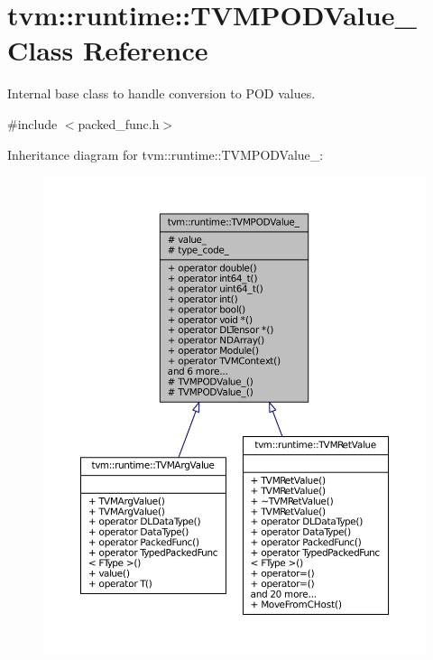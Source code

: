 \hypertarget{classtvm_1_1runtime_1_1TVMPODValue__}{}\section{tvm\+:\+:runtime\+:\+:T\+V\+M\+P\+O\+D\+Value\+\_\+ Class Reference}
\label{classtvm_1_1runtime_1_1TVMPODValue__}


Internal base class to handle conversion to P\+OD values.  




{\ttfamily \#include $<$packed\+\_\+func.\+h$>$}



Inheritance diagram for tvm\+:\+:runtime\+:\+:T\+V\+M\+P\+O\+D\+Value\+\_\+\+:
\nopagebreak
\begin{figure}[H]
\begin{center}
\leavevmode
\includegraphics[width=350pt]{classtvm_1_1runtime_1_1TVMPODValue____inherit__graph}
\end{center}
\end{figure}


